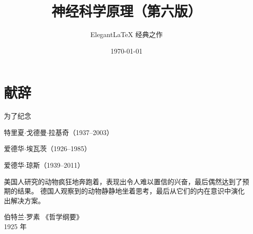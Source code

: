 \documentclass[cn,10pt,citestyle=gb7714-2015, bibstyle=gb7714-2015]{elegantbook}
\title{神经科学原理（第六版）}
\subtitle{Elegant\LaTeX{} 经典之作}
\institute{\href{https://github.com/OpenHUTB/neuro}{开源湖工商}}
\date{\today}
\numberwithin{figure}{section}
\begin{document}
\maketitle
\frontmatter

\chapter*{献辞}



\begin{center}
为了纪念

特里夏$\cdot$戈德曼$\cdot$拉基奇（1937–2003）

爱德华$\cdot$埃瓦茨（1926–1985）

爱德华$\cdot$琼斯（1939–2011）
\end{center}


\vskip 1.5cm

美国人研究的动物疯狂地奔跑着，表现出令人难以置信的兴奋，最后偶然达到了预期的结果。
德国人观察到的动物静静地坐着思考，最后从它们的内在意识中演化出解决方案。


\vskip 0.5cm


\vskip 1.5cm

\begin{flushright}
伯特兰$\cdot$罗素  《哲学纲要》\\
1925 年
\end{flushright}

\tableofcontents

\mainmatter











































\end{document}
